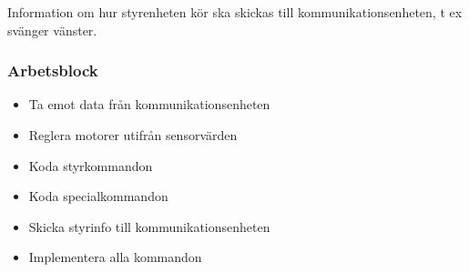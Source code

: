 \documentclass[a4paper,12pt]{article}
\begin{document}
Information om hur styrenheten kör ska skickas till kommunikationsenheten, t ex svänger vänster.

\subsubsection{Arbetsblock}
\begin{itemize}
        \item Ta emot data från kommunikationsenheten
        \item Reglera motorer utifrån sensorvärden
        \item Koda styrkommandon
        \item Koda specialkommandon
        \item Skicka styrinfo till kommunikationsenheten
        \item Implementera alla kommandon
\end{itemize}
\end{document}
